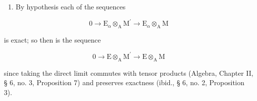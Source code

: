 \begin{enumerate}
\def\labelenumi{(\roman{enumi})}
\setcounter{enumi}{1}
\tightlist
\item
  By hypothesis each of the sequences
\end{enumerate}

\[
0 \rightarrow \mathrm{E} _ {\alpha} \otimes_ {\mathrm{A}} \mathrm{M} ^ {\prime} \rightarrow \mathrm{E} _ {\alpha} \otimes_ {\mathrm{A}} \mathrm{M}
\]

is exact; so then is the sequence

\[
0 \rightarrow \mathrm{E} \otimes_ {\mathrm{A}} \mathrm{M} ^ {\prime} \rightarrow \mathrm{E} \otimes_ {\mathrm{A}} \mathrm{M}
\]

since taking the direct limit commutes with tensor products (Algebra, Chapter II, § 6, no. 3, Proposition 7) and preserves exactness (ibid., § 6, no. 2, Proposition 3).

